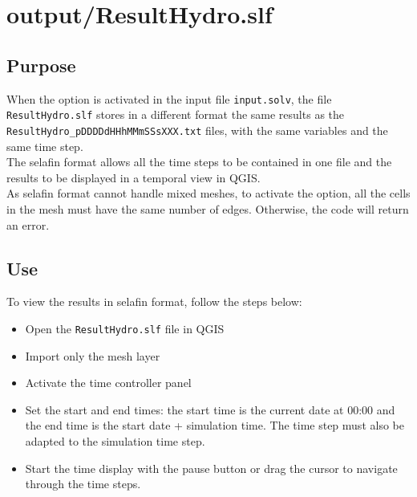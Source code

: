 \section{output/ResultHydro.slf}\label{sec:selafin_output}

\subsection{Purpose}
When the  option is activated in the input file \texttt{input.solv}, the file \texttt{ResultHydro.slf} stores in a different format the same results as the \texttt{ResultHydro\_pDDDDdHHhMMmSSsXXX.txt} files, with the same variables and the same time step.\\

The selafin format allows all the time steps to be contained in one file and the results to be displayed in a temporal view in QGIS.\\

As selafin format cannot handle mixed meshes, to activate the  option, all the cells in the mesh must have the same number of edges. Otherwise, the code will return an error.

\subsection{Use}

To view the results in selafin format, follow the steps below:
\begin{itemize}
    \item Open the \texttt{ResultHydro.slf} file in QGIS
    \item Import only the mesh layer
    \item Activate the time controller panel
    \item Set the start and end times: the start time is the current date at 00:00 and the end time is the start date + simulation time. The time step must also be adapted to the simulation time step.
    \item Start the time display with the pause button or drag the cursor to navigate through the time steps.
\end{itemize}

    
